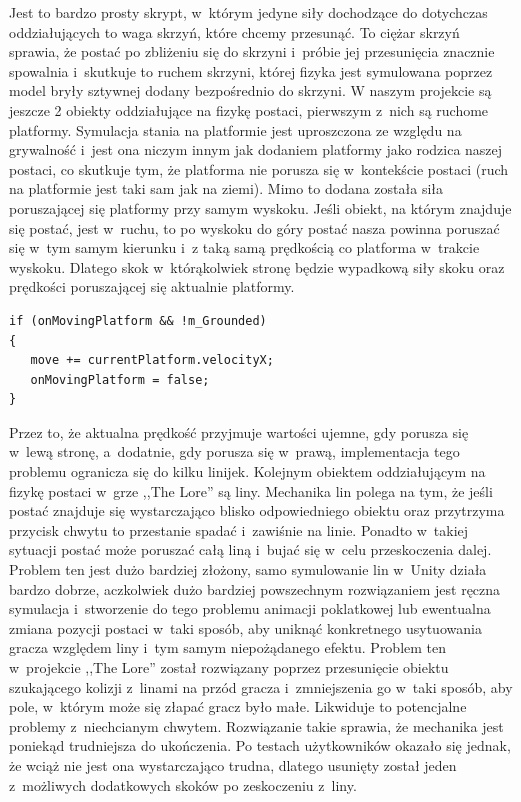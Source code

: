 \documentclass[oneside,polski,logo]{amuthesis}
\begin{document}
Jest to bardzo prosty skrypt, w~którym jedyne siły dochodzące do dotychczas oddziałujących to waga skrzyń, które chcemy przesunąć. To ciężar skrzyń sprawia, że postać po zbliżeniu się do skrzyni i~próbie jej przesunięcia znacznie spowalnia i~skutkuje to ruchem skrzyni, której fizyka jest symulowana poprzez model bryły sztywnej dodany bezpośrednio do skrzyni.
W naszym projekcie są jeszcze 2 obiekty oddziałujące na fizykę postaci, pierwszym z~nich są ruchome platformy. Symulacja stania na platformie jest uproszczona ze względu na grywalność i~jest ona niczym innym jak dodaniem platformy jako rodzica naszej postaci, co skutkuje tym, że platforma nie porusza się w~kontekście postaci (ruch na platformie jest taki sam jak na ziemi). Mimo to dodana została siła poruszającej się platformy przy samym wyskoku. Jeśli obiekt, na którym znajduje się postać, jest w~ruchu, to po wyskoku do góry postać nasza powinna poruszać się w~tym samym kierunku i~z taką samą prędkością co platforma w~trakcie wyskoku. Dlatego skok w~którąkolwiek stronę będzie wypadkową siły skoku oraz prędkości poruszającej się aktualnie platformy.

\begin{lstlisting}[breaklines=true,
language={[Sharp]C},
rulecolor=\color{blue!80!black},
caption={Fragment klasy \texttt{PlayerMovement.cs}}
]
if (onMovingPlatform && !m_Grounded)
{
   move += currentPlatform.velocityX;
   onMovingPlatform = false;
}
\end{lstlisting}
Przez to, że aktualna prędkość przyjmuje wartości ujemne, gdy porusza się w~lewą stronę, a~dodatnie, gdy porusza się w~prawą, implementacja tego problemu ogranicza się do kilku linijek.
Kolejnym obiektem oddziałującym na fizykę postaci w~grze ,,The Lore'' są liny. Mechanika lin polega na tym, że jeśli postać znajduje się wystarczająco blisko odpowiedniego obiektu oraz przytrzyma przycisk chwytu to przestanie spadać i~zawiśnie na linie. Ponadto w~takiej sytuacji postać może poruszać całą liną i~bujać się w~celu przeskoczenia dalej. Problem ten jest dużo bardziej złożony, samo symulowanie lin w~Unity działa bardzo dobrze, aczkolwiek dużo bardziej powszechnym rozwiązaniem jest ręczna symulacja i~stworzenie do tego problemu animacji poklatkowej lub ewentualna zmiana pozycji postaci w~taki sposób, aby uniknąć konkretnego usytuowania gracza względem liny i~tym samym niepożądanego efektu. Problem ten w~projekcie ,,The Lore'' został rozwiązany poprzez przesunięcie obiektu szukającego kolizji z~linami na przód gracza i~zmniejszenia go w~taki sposób, aby pole, w~którym może się złapać gracz było małe. Likwiduje to potencjalne problemy z~niechcianym chwytem. Rozwiązanie takie sprawia, że mechanika jest poniekąd trudniejsza do ukończenia. Po testach użytkowników okazało się jednak, że wciąż nie jest ona wystarczająco trudna, dlatego usunięty został jeden z~możliwych dodatkowych skoków po zeskoczeniu z~liny.
\end{document}
